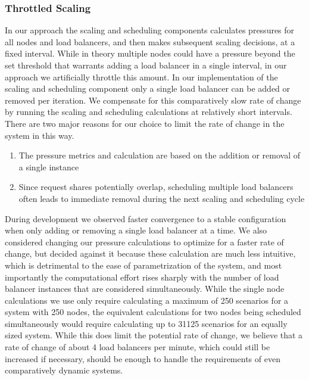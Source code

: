 \subsubsection{Throttled Scaling}
In our approach the scaling and scheduling components calculates pressures for all nodes and load balancers, and then makes subsequent scaling decisions, at a fixed interval.
While in theory multiple nodes could have a pressure beyond the set threshold that warrants adding a load balancer in a single interval, in our approach we artificially throttle this amount.
In our implementation of the scaling and scheduling component only a single load balancer can be added or removed per iteration.
We compensate for this comparatively slow rate of change by running the scaling and scheduling calculations at relatively short intervals.
There are two major reasons for our choice to limit the rate of change in the system in this way.

\begin{enumerate}
    \item The pressure metrics and calculation are based on the addition or removal of a single instance
    \item Since request shares potentially overlap, scheduling multiple load balancers often leads to immediate removal during the next scaling and scheduling cycle
\end{enumerate}

During development we observed faster convergence to a stable configuration when only adding or removing a single load balancer at a time.
We also considered changing our pressure calculations to optimize for a faster rate of change, but decided against it because these calculation are much less intuitive, which is detrimental to the ease of parametrization of the system, and most importantly the computational effort rises sharply with the number of load balancer instances that are considered simultaneously.
While the single node calculations we use only require calculating a maximum of 250 scenarios for a system with 250 nodes, the equivalent calculations for two nodes being scheduled simultaneously would require calculating up to 31125 scenarios for an equally sized system.
While this does limit the potential rate of change, we believe that a rate of change of about 4 load balancers per minute, which could still be increased if necessary, should be enough to handle the requirements of even comparatively dynamic systems.



